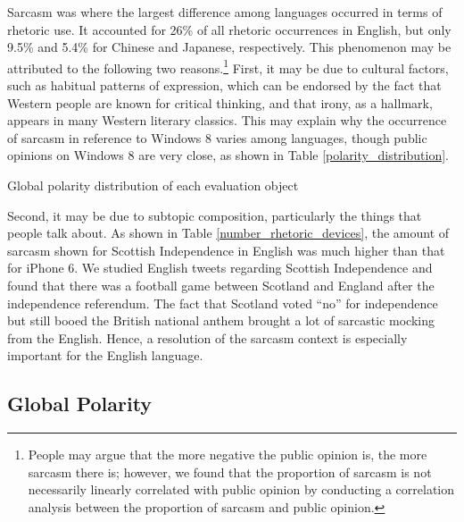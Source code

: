 \documentclass[english]{jnlp_1.4}
\begin{document}
\begin{table}[t]
\label{number_rhetoric_devices}

\end{table}

Sarcasm was where the largest difference among languages occurred in terms of rhetoric use. It accounted for 26\% of all rhetoric occurrences in English, but only 9.5\% and 5.4\% for Chinese and Japanese, respectively. This phenomenon may be attributed to the following two reasons.\footnote{People may argue that the more negative the public opinion is, the more sarcasm there is; however, we found that the proportion of sarcasm is not necessarily linearly correlated with public opinion by conducting a correlation analysis between the proportion of sarcasm and public opinion.} First, it may be due to cultural factors, such as habitual patterns of expression, which can be endorsed by the fact that Western people are known for critical thinking, and that irony, as a hallmark, appears in many Western literary classics. This may explain why the occurrence of sarcasm in reference to Windows 8 varies among languages, though public opinions on Windows 8 are very close, as shown in Table \ref{polarity_distribution}.

\begin{table}[t]
\caption{Global polarity distribution of each evaluation object}
\label{polarity_distribution}

\end{table}

Second, it may be due to subtopic composition, particularly the things that people talk about. As shown in Table \ref{number_rhetoric_devices}, the amount of sarcasm shown for Scottish Independence in English was much higher than that for iPhone 6. We studied English tweets regarding Scottish Independence and found that there was a football game between Scotland and England after the independence referendum. The fact that Scotland voted ``no'' for independence but still booed the British national anthem brought a lot of sarcastic mocking from the English. Hence, a resolution of the sarcasm context is especially important for the English language.


\subsection{Global Polarity}
\end{document}
